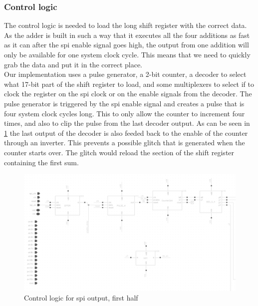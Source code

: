 \subsubsection{Control logic}
The control logic is needed to load the long shift register with the correct data. \\
As the adder is built in such a way that it executes all the four additions as fast as it can after the spi enable signal goes high, the output from one addition will only be available for one system clock cycle. This means that we need to quickly grab the data and put it in the correct place.\\ 
Our implementation uses a pulse generator, a 2-bit counter, a decoder to select what 17-bit part of the shift register to load, and some multiplexers to select if to clock the register on the spi clock or on the enable signals from the decoder. The pulse generator is triggered by the spi enable signal and creates a pulse that is four system clock cycles long. This to only allow the counter to increment four times, and also to clip the pulse from the last decoder output. As can be seen in \ref{spi_out1} the last output of the decoder is also feeded back to the enable of the counter through an inverter. This prevents a possible glitch that is generated when the counter starts over. The glitch would reload the section of the shift register containing the first sum. \\

\begin{figure}[H]
\centering
\captionsetup{justification=centering}
\includegraphics[scale=0.2]{../figures/spi_out1.png}
\caption{Control logic for spi output, first half}
\label{spi_out1}
\end{figure}

